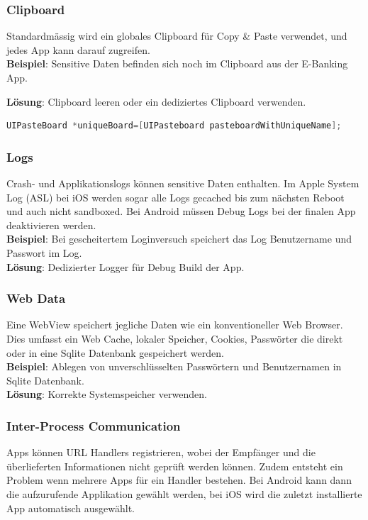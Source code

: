 \subsubsection{Clipboard}
Standardmässig wird ein globales Clipboard für Copy \& Paste verwendet, und jedes App kann darauf zugreifen. \\
\textbf{Beispiel}: Sensitive Daten befinden sich noch im Clipboard aus der E-Banking App.

\textbf{Lösung}: Clipboard leeren oder ein dediziertes Clipboard verwenden.
\begin{lstlisting}[language=C, caption=Lösung für iOS]
UIPasteBoard *uniqueBoard=[UIPasteboard pasteboardWithUniqueName];
\end{lstlisting}

\subsubsection{Logs}
Crash- und Applikationslogs können sensitive Daten enthalten. Im Apple System Log (ASL) bei iOS werden sogar alle Logs gecached bis zum nächsten Reboot und auch nicht sandboxed. Bei Android müssen Debug Logs bei der finalen App deaktivieren werden. \\

\textbf{Beispiel}: Bei gescheitertem Loginversuch speichert das Log Benutzername und Passwort im Log. \\

\textbf{Lösung}: Dedizierter Logger für Debug Build der App.

\subsubsection{Web Data}
Eine WebView speichert jegliche Daten wie ein konventioneller Web Browser. Dies umfasst ein Web Cache, lokaler Speicher, Cookies, Passwörter die direkt oder in eine Sqlite Datenbank gespeichert werden. \\

\textbf{Beispiel}: Ablegen von unverschlüsselten Passwörtern und Benutzernamen in Sqlite Datenbank.\\

\textbf{Lösung}: Korrekte Systemspeicher verwenden.

\subsubsection{Inter-Process Communication}
Apps können URL Handlers registrieren, wobei der Empfänger und die überlieferten Informationen nicht geprüft werden können. Zudem entsteht ein Problem wenn mehrere Apps für ein Handler bestehen. Bei Android kann dann die aufzurufende Applikation gewählt werden, bei iOS wird die zuletzt installierte App automatisch ausgewählt.\\


